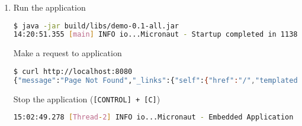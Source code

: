 \begin{enumerate}
	\item Run the application

	      \begin{lstlisting}[language=bash]
$ java -jar build/libs/demo-0.1-all.jar
14:20:51.355 [main] INFO io...Micronaut - Startup completed in 1138ms. Server Running: http://localhost:8080
	      \end{lstlisting}

	      Make a request to application

	      \begin{lstlisting}[language=bash]
$ curl http://localhost:8080
{"message":"Page Not Found","_links":{"self":{"href":"/","templated":false}}}
	      \end{lstlisting}

	      Stop the application (\texttt{[CONTROL] + [C]})

	      \begin{lstlisting}[language=bash]
15:02:49.278 [Thread-2] INFO io...Micronaut - Embedded Application shutting down
	      \end{lstlisting}

\end{enumerate}